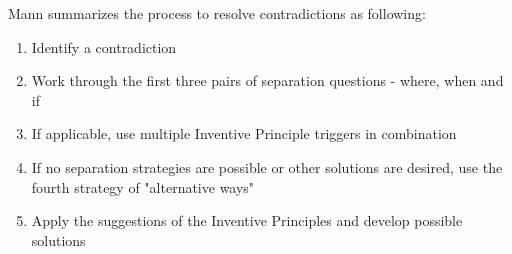 \documentclass{article}
\begin{document}
Mann summarizes the process to resolve contradictions as following:

\begin{enumerate}
    \item Identify a contradiction
    \item Work through the first three pairs of separation questions - where, when and if
    \item If applicable, use multiple Inventive Principle triggers in combination
    \item If no separation strategies are possible or other solutions are desired, use the fourth strategy of "alternative ways"
    \item Apply the suggestions of the Inventive Principles and develop possible solutions
\end{enumerate}
\end{document}
